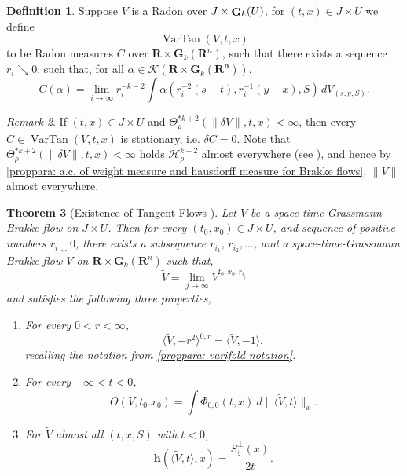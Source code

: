 \documentclass{article}
\theoremstyle{plain}
\newtheorem{theorem}{Theorem}[section]
\theoremstyle{definition}
\newtheorem{definition}[theorem]{Definition}
\theoremstyle{plain}
\theoremstyle{remark}
\theoremstyle{remark}
\newtheorem{remark}[theorem]{Remark}
\theoremstyle{plain}
\DeclareMathOperator{\G}{{\bf G}}
\DeclareMathOperator{\VarTan}{VarTan}
\begin{document}
\begin{definition}
    Suppose $V$ is a Radon over $J\times \G_k(U)$, for $(t, x) \in J \times U$ we define
    \[ \VarTan(V,t,x)\]
    to be Radon measures $C$ over $\mathbf{R} \times \mathbf{G}_{k} (\mathbf{R}^{n})$, such that there exists a sequence $r_{i} \searrow 0$, such that, for all $\alpha \in \mathscr{K} (\mathbf{R} \times \mathbf{G}_{k} (\mathbf{R^{n}}))$,  
    \begin{equation*}
         C (\alpha) = \lim_{i \rightarrow \infty} r_{i}^{-k - 2} \int \alpha (r_{i}^{-2} (s - t), r_{i}^{-1} (y - x), S) \, d V_{(s, y, S)}.
    \end{equation*}
\end{definition}

\begin{remark}\label{rmk:almost every where stationary tangent flow}
    If $(t,x)  \in J \times U$ and $\Theta_{\rho}^{\ast k+2}(\|\delta V\|,t,x)<\infty$, then  
    every $C \in \VarTan(V,t,x)$ is stationary, i.e. $\delta C = 0$.
    Note that  $\Theta_{\rho}^{\ast k+2}(\|\delta V\|,t,x)<\infty$ holds $\mathscr{H}^{k + 2}_{\rho}$ almost everywhere (see \cite[2.10.19(3)]{MR41:1976}), and hence by \ref{proppara: a.c. of weight measure and hausdorff measure for Brakke flows}, $\| V \|$ almost everywhere.
\end{remark}


\begin{theorem}[Existence of Tangent Flows ]\label{thm: existence of tangent flows}
    Let $V$ be a space-time-Grassmann Brakke flow on $J \times U$. 
    Then for every $(t_{0}, x_{0}) \in J \times U$, and sequence of positive numbers $r_{i} \downarrow 0$, there exists a subsequence $r_{i_{1}}, \, r_{i_{2}}, \ldots$, and a space-time-Grassmann Brakke flow $\tilde{V}$ on $\mathbf{R} \times \mathbf{G}_{k} (\mathbf{R}^{n})$
    such that, 
    \begin{equation*}
        \tilde{V} = \lim_{j \rightarrow \infty} V^{t_{0}, x_{0}; r_{i_{j}}}
    \end{equation*}
    and satisfies the following three properties,
    \begin{enumerate}[label=\ref{thm: existence of tangent flows}.\arabic{enumi}]
        \item\label{thm: scale invariance of tangent flows} For every $0<r<\infty$,
        \[ \langle \tilde{V}, - r^{2} \rangle^{0; r}  = \langle \tilde{V}, -1 \rangle,\]
        recalling the notation from \ref{proppara: varifold notation}.
        \item\label{thm: Monotonicity of tangent flows} For every $-\infty <t<0$,
        \[ \Theta(V,t_0.x_0) = \textstyle \int \Phi_{0,0}(t,x) \ d \|\langle \tilde{V},t\rangle\|_x.\]
        \item\label{thm: self shrinker equation} For $\tilde{V}$ almost all $(t, x, S)$ with $t<0$,
        \begin{equation*}
        \mathbf{h} (\langle \tilde{V}, t \rangle, x) = \frac{S^{\perp}_{\natural} (x)}{2 t}.
    \end{equation*}
    \end{enumerate}
\end{theorem}
\end{document}
